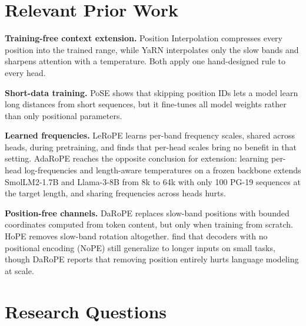 \documentclass[11pt]{article}
\begin{document}
\section{Relevant Prior Work}

\textbf{Training-free context extension.} Position Interpolation \citep{chen2023pi} compresses every position into the trained range, while YaRN \citep{peng2024yarn} interpolates only the slow bands and sharpens attention with a temperature. Both apply one hand-designed rule to every head.

\textbf{Short-data training.} PoSE \citep{zhu2024pose} shows that skipping position IDs lets a model learn long distances from short sequences, but it fine-tunes all model weights rather than only positional parameters.

\textbf{Learned frequencies.} LeRoPE \citep{karypis2026lerope} learns per-band frequency scales, shared across heads, during pretraining, and finds that per-head scales bring no benefit in that setting. AdaRoPE \citep{wang2026adarope} reaches the opposite conclusion for extension: learning per-head log-frequencies and length-aware temperatures on a frozen backbone extends SmolLM2-1.7B and Llama-3-8B from 8k to 64k with only 100 PG-19 sequences at the target length, and sharing frequencies across heads hurts.

\textbf{Position-free channels.} DaRoPE \citep{levy2026darope} replaces slow-band positions with bounded coordinates computed from token content, but only when training from scratch. HoPE \citep{chen2025hope} removes slow-band rotation altogether. \citet{kazemnejad2023nope} find that decoders with no positional encoding (NoPE) still generalize to longer inputs on small tasks, though DaRoPE reports that removing position entirely hurts language modeling at scale.

\section{Research Questions}
\end{document}
